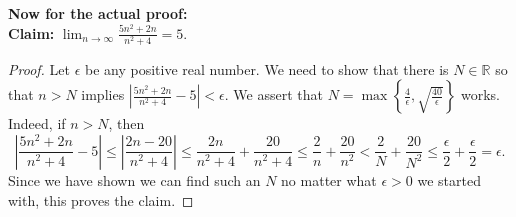 \documentclass[11pt,dvipsnames]{book}
\numberwithin{equation}{section} %
\numberwithin{figure}{section} %
\numberwithin{table}{section} %
\begin{document}
\begin{example}
{\bf Now for the actual proof:} \\

{\bf Claim:} $\lim_{n\rightarrow\infty}\frac{5n^2+2n}{n^2+4}=5$. 

\begin{proof}
Let $\epsilon$ be any positive real number. We need to show that there is $N\in\mathbb{R}$ so that $n> N$ implies $\left|\frac{5n^2+2n}{n^2+4}-5\right|<\epsilon$. We assert that $N=\max\left\{\frac{4}{\epsilon}, \sqrt{\frac{40}{\epsilon}}\right\} $ works. Indeed, if $n> N$, then
\[\left|\frac{5n^2+2n}{n^2+4}-5\right|
\leq \left| \frac{2n-20}{n^2+4} \right| 
\leq \frac{2n}{n^2 + 4} + \frac{20}{n^2 + 4}
\leq \frac{2}{n} + \frac{20}{n^2} < \frac{2}{N} + \frac{20}{N^2} \leq \frac{\epsilon}{2}+ \frac{\epsilon}{2} = \epsilon.
\]
 Since we have shown we can find such an $N$ no matter what $\epsilon>0$ we started with, this proves the claim.

\end{proof}
\end{example}
\end{document}
